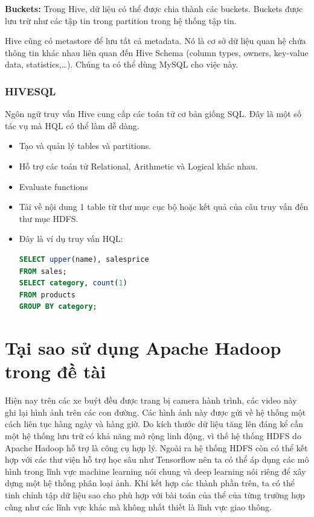 \textbf{Buckets:} Trong Hive, dữ liệu có thể được chia thành các buckets. Buckets được lưu trữ như các tập tin trong partition trong hệ thống tập tin.\par
Hive cũng có metastore để lưu tất cả metadata. Nó là cơ sở dữ liệu quan hệ chứa thông tin khác nhau liên quan đến Hive Schema (column types, owners, key-value data, statistics,…). Chúng ta có thể dùng MySQL cho việc này.
\subsubsection{HIVESQL}
Ngôn ngữ truy vấn Hive cung cấp các toán tử cơ bản giống SQL. Đây là một số tác vụ mà HQL có thể làm dễ dàng.
\begin{itemize}
	\item Tạo và quản lý tables và partitions.
	\item Hỗ trợ các toán tử Relational, Arithmetic và Logical khác nhau.
	\item Evaluate functions
	\item Tải về nội dung 1 table từ thư mục cục bộ hoặc kết quả của câu truy vấn đến thư mục HDFS.
	\item Đây là ví dụ truy vấn HQL:
	\begin{lstlisting}[language=SQL]
SELECT upper(name), salesprice 
FROM sales; 
SELECT category, count(1) 
FROM products 
GROUP BY category;

	\end{lstlisting}
\end{itemize}
\section{ Tại sao sử dụng Apache Hadoop trong đề tài}
Hiện nay trên các xe buýt đều được trang bị camera hành trình, các video này ghi lại hình ảnh trên các con đường. Các hình ảnh này được gửi về hệ thống một cách liên tục hàng ngày và hàng giờ. Do kích thước dữ liệu tăng lên đáng kể cần một hệ thống lưu trữ có khả năng mở rộng linh động, vì thế hệ thống HDFS do Apache Hadoop hỗ trợ là công cụ hợp lý. Ngoài ra hệ thống HDFS còn có thể kết hợp với các thư viện hỗ trợ học sâu như Tensorflow nên ta có thể áp dụng các mô hình trong lĩnh vực machine learning nói chung và deep learning nói riêng để xây dựng một hệ thống phân loại ảnh. Khi kết hợp các thành phần trên, ta có thể tinh chỉnh tập dữ liệu sao cho phù hợp với bài toán của thể của từng trường hợp cũng như các lĩnh vực khác mà không nhất thiết là lĩnh vực giao thông.

	
	
	
	
